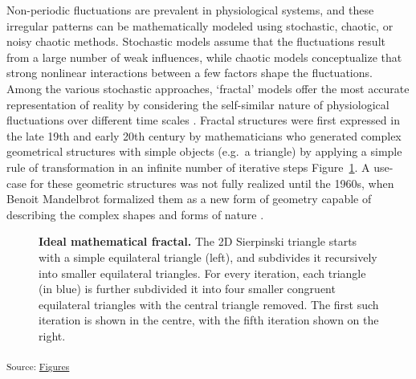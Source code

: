 \documentclass[
  sn-vancouver,
  Numbered,
  referee,
  lineno]{sn-jnl}
\begin{document}
Non-periodic fluctuations are prevalent in physiological systems, and
these irregular patterns can be mathematically modeled using stochastic,
chaotic, or noisy chaotic methods. Stochastic models assume that the
fluctuations result from a large number of weak influences, while
chaotic models conceptualize that strong nonlinear interactions between
a few factors shape the fluctuations. Among the various stochastic
approaches, `fractal' models offer the most accurate representation of
reality by considering the self-similar nature of physiological
fluctuations over different time scales
\citep{ekeFractalCharacterizationComplexity2002}. Fractal structures
were first expressed in the late 19th and early 20th century by
mathematicians who generated complex geometrical structures with simple
objects (e.g.~a triangle) by applying a simple rule of transformation in
an infinite number of iterative steps Figure~\ref{fig-fractal}. A
use-case for these geometric structures was not fully realized until the
1960s, when Benoit Mandelbrot formalized them as a new form of geometry
capable of describing the complex shapes and forms of nature
\citep{mandelbrotHowLongCoast1967}.

\begin{figure}[H]


\caption{\label{fig-fractal}\textbf{Ideal mathematical fractal.} The 2D
Sierpinski triangle starts with a simple equilateral triangle (left),
and subdivides it recursively into smaller equilateral triangles. For
every iteration, each triangle (in blue) is further subdivided it into
four smaller congruent equilateral triangles with the central triangle
removed. The first such iteration is shown in the centre, with the fifth
iteration shown on the right.}

\end{figure}%

\textsubscript{Source:
\href{https://WeberLab.github.io/Hurst_LitReview/notebooks/Figures-preview.html\#cell-fig-fractal}{Figures}}
\end{document}
